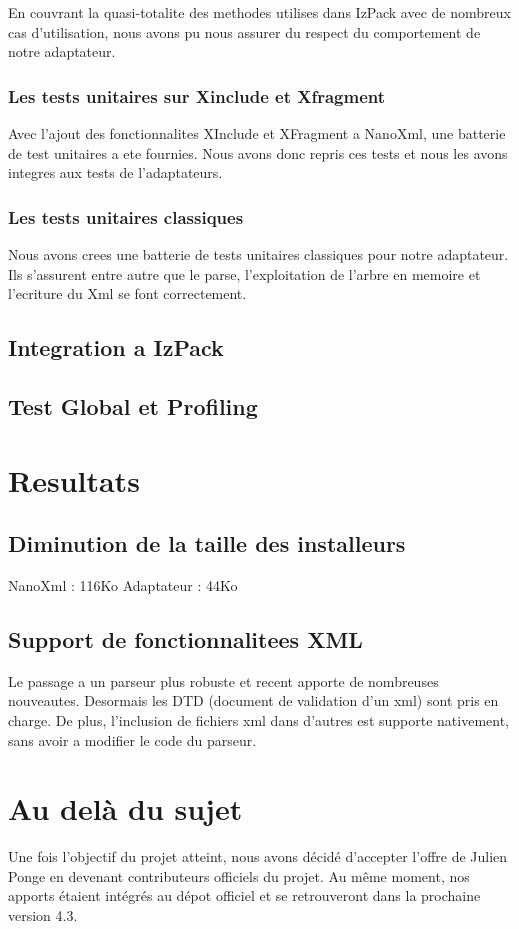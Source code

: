 En couvrant la quasi-totalite des methodes utilises dans IzPack avec de nombreux cas d'utilisation, nous avons pu nous assurer du respect du comportement de notre adaptateur.
\subsubsection{Les tests unitaires sur Xinclude et Xfragment}
Avec l'ajout des fonctionnalites XInclude et XFragment a NanoXml, une batterie de test unitaires a ete fournies. Nous avons donc repris ces tests et nous les avons integres aux tests de l'adaptateurs. 
\subsubsection{Les tests unitaires classiques}
Nous avons crees une batterie de tests unitaires classiques pour notre adaptateur. Ils s'assurent entre autre que le parse, l'exploitation de l'arbre en memoire et l'ecriture du Xml se font correctement.
\subsection{Integration a IzPack}

\subsection{Test Global et Profiling}

\section{Resultats}
\subsection{Diminution de la taille des installeurs}
NanoXml : 116Ko
Adaptateur : 44Ko
\subsection{Support de fonctionnalitees XML}
Le passage a un parseur plus robuste et recent apporte de nombreuses nouveautes.
Desormais les DTD (document de validation d'un xml) sont pris en charge.
De plus, l'inclusion de fichiers xml dans d'autres est supporte nativement, sans avoir a modifier le code du parseur.

\section{Au delà du sujet}
Une fois l'objectif du projet atteint, nous avons décidé d'accepter l'offre de Julien Ponge en devenant contributeurs officiels du projet. Au même moment, nos apports étaient intégrés au dépot officiel et se retrouveront dans la prochaine version 4.3.

